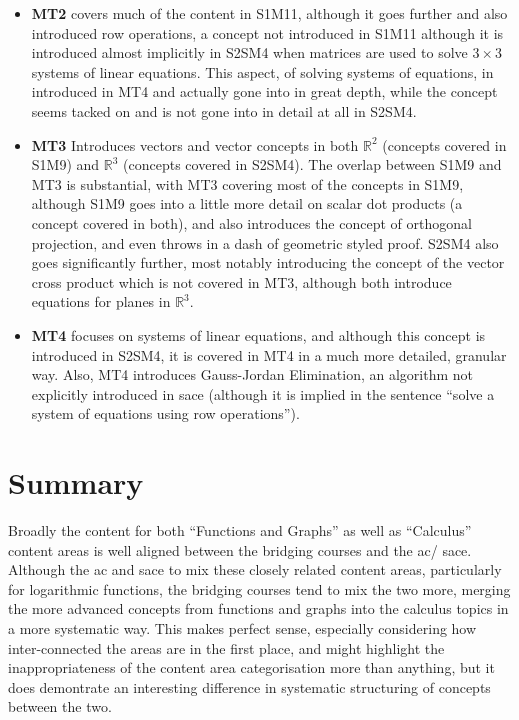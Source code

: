 \documentclass[twoside,12pt,a4paper]{report}
\begin{document}
\begin{itemize}
	\item \textbf{MT2} covers much of the content in S1M11, although it goes further and also introduced row operations, a concept not introduced in S1M11 although it is introduced almost implicitly in S2SM4 when matrices are used to solve $3 \times 3$ systems of linear equations. This aspect, of solving systems of equations, in introduced in MT4 and actually gone into in great depth, while the concept seems tacked on and is not gone into in detail at all in S2SM4.
	\item \textbf{MT3} Introduces vectors and vector concepts in both $\mathbb{R}^2$ (concepts covered in S1M9) and $\mathbb{R}^3$ (concepts covered in S2SM4). The overlap between S1M9 and MT3 is substantial, with MT3 covering most of the concepts in S1M9, although S1M9 goes into a little more detail on scalar dot products (a concept covered in both), and also introduces the concept of orthogonal projection, and even throws in a dash of geometric styled proof. S2SM4 also goes significantly further, most notably introducing the concept of the vector cross product which is not covered in MT3, although both introduce equations for planes in $\mathbb{R}^3$.
	\item \textbf{MT4} focuses on systems of linear equations, and although this concept is introduced in S2SM4, it is covered in MT4 in a much more detailed, granular way. Also, MT4 introduces Gauss-Jordan Elimination, an algorithm not explicitly introduced in \gls{sace} (although it is implied in the sentence ``solve a system of equations using row operations'').
\end{itemize}







\section{Summary}
\label{sec:curriculumRecommendations}

Broadly the content for both ``Functions and Graphs'' as well as ``Calculus'' content areas is well aligned between the bridging courses and the \gls{ac}/ \gls{sace}. Although the \gls{ac} and \gls{sace} to mix these closely related content areas, particularly for logarithmic functions, the bridging courses tend to mix the two more, merging the more advanced concepts from functions and graphs into the calculus topics in a more systematic way. This makes perfect sense, especially considering how inter-connected the areas are in the first place, and might highlight the inappropriateness of the content area categorisation more than anything, but it does demontrate an interesting difference in systematic structuring of concepts between the two. 
\end{document}
